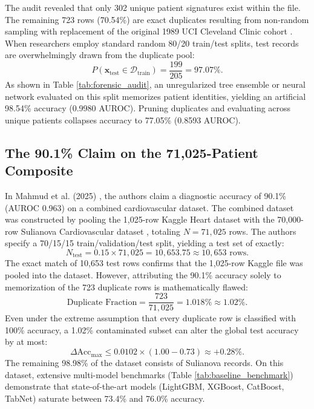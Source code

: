 \documentclass[journal]{IEEEtran}
\begin{document}
The audit revealed that only 302 unique patient signatures exist within the file. The remaining 723 rows (70.54\%) are exact duplicates resulting from non-random sampling with replacement of the original 1989 UCI Cleveland Clinic cohort \cite{detrano1989}. When researchers employ standard random 80/20 train/test splits, test records are overwhelmingly drawn from the duplicate pool:
\begin{equation}
P(\mathbf{x}_{\text{test}} \in \mathcal{D}_{\text{train}}) = \frac{199}{205} = 97.07\%.
\end{equation}
As shown in Table \ref{tab:forensic_audit}, an unregularized tree ensemble or neural network evaluated on this split memorizes patient identities, yielding an artificial 98.54\% accuracy (0.9980 AUROC). Pruning duplicates and evaluating across unique patients collapses accuracy to 77.05\% (0.8593 AUROC).

\subsection{The 90.1\% Claim on the 71,025-Patient Composite}
In Mahmud et al. (2025) \cite{mahmud2025}, the authors claim a diagnostic accuracy of 90.1\% (AUROC 0.963) on a combined cardiovascular dataset. The combined dataset was constructed by pooling the 1,025-row Kaggle Heart dataset with the 70,000-row Sulianova Cardiovascular dataset \cite{mahmud2025}, totaling $N = 71,025$ rows. The authors specify a 70/15/15 train/validation/test split, yielding a test set of exactly:
\begin{equation}
N_{\text{test}} = 0.15 \times 71,025 = 10,653.75 \approx 10,653 \text{ rows}.
\end{equation}
The exact match of 10,653 test rows confirms that the 1,025-row Kaggle file was pooled into the dataset. However, attributing the 90.1\% accuracy solely to memorization of the 723 duplicate rows is mathematically flawed:
\begin{equation}
\text{Duplicate Fraction} = \frac{723}{71,025} = 1.018\% \approx 1.02\%.
\end{equation}
Even under the extreme assumption that every duplicate row is classified with 100\% accuracy, a 1.02\% contaminated subset can alter the global test accuracy by at most:
\begin{equation}
\Delta \text{Acc}_{\text{max}} \le 0.0102 \times (1.00 - 0.73) \approx +0.28\%.
\end{equation}
The remaining 98.98\% of the dataset consists of Sulianova records. On this dataset, extensive multi-model benchmarks (Table \ref{tab:baseline_benchmark}) demonstrate that state-of-the-art models (LightGBM, XGBoost, CatBoost, TabNet) saturate between 73.4\% and 76.0\% accuracy.
\end{document}

